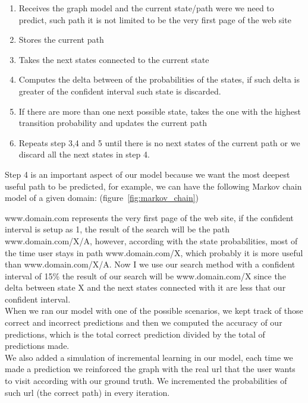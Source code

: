 \begin{enumerate}
  \item Receives the graph model and the current state/path were we need to predict, such path it is not limited to be the very first page of the web site
  \item Stores the current path
  \item Takes the next states connected to the current state
  \item Computes the delta between of the probabilities of the states, if such delta is greater of the confident interval such state is discarded.
  \item If there are more than one next possible state, takes the one with the highest transition probability and updates the current path
  \item Repeats step 3,4 and 5 until there is no next states of the current path or we discard all the next states in step 4.
\end{enumerate}

Step 4 is an important aspect of our model because we want the most deepest useful path to be predicted, for example, we can have the following Markov chain model of a given domain: (figure~\ref{fig:markov_chain})



www.domain.com represents the very first page of the web site, if the confident interval is setup as 1, the result of the search will be the path www.domain.com/X/A, however, according with the state probabilities, most of the time user stays in path www.domain.com/X, which probably it is more useful than www.domain.com/X/A. Now I we use our search method with a confident interval of 15\% the result of our search will be www.domain.com/X since the delta between state X and the next states connected with it are less that our confident interval.
\\[2ex]
When we ran our model with one of the possible scenarios, we kept track of those correct and incorrect predictions and then we computed the accuracy of our predictions, which is the total correct prediction divided by the total of predictions made. 
\\[2ex]
We also added a simulation of incremental learning in our model, each time we made a prediction we reinforced the graph with the real url that the user wants to visit according with our ground truth. We incremented the probabilities of such url (the correct path) in every iteration.

